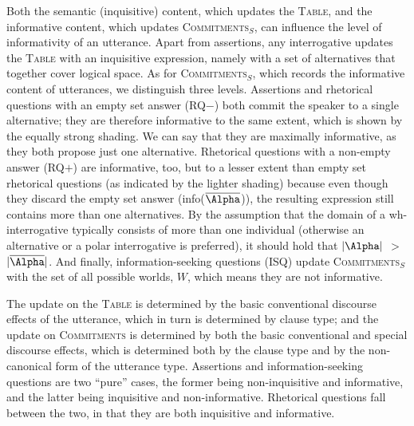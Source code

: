 \documentclass[output=paper,colorlinks,citecolor=brown            ,chinesefont]{langscibook}
\begin{document}
Both the semantic (inquisitive) content, which updates the \textsc{Table}, and the informative content, which updates \textsc{Commitments}$_S$, can influence the level of informativity of an utterance. Apart from assertions, any interrogative updates the \textsc{Table} with an inquisitive expression, namely with a set of alternatives that together cover logical space. As for \textsc{Commitments}$_S$, which records the informative content of utterances, we distinguish three levels. Assertions and rhetorical questions with an empty set answer (RQ$-$) both commit the speaker to a single alternative; they are therefore informative to the same extent, which is shown by the equally strong shading. We can say that they are maximally informative, as they both propose just one alternative. Rhetorical questions with a non-empty answer (RQ$+$) are informative, too, but to a lesser extent than empty set rhetorical questions (as indicated by the lighter shading) because even though they discard the empty set answer (info($\overline{\Alpha}$)), the resulting expression still contains more than one alternatives. By the assumption that the domain of a wh-interrogative typically consists of more than one individual (otherwise an alternative or a polar interrogative is preferred), it should hold that $|\Alpha|$ $>$ $|\overline{\Alpha}|$. And finally, information-seeking questions (ISQ) update \textsc{Commitments}$_S$ with the set of all possible worlds, $W$, which means they are not informative.

The update on the \textsc{Table} is determined by the basic conventional discourse effects of the utterance, which in turn is determined by clause type; and the update on \textsc{Commitments} is determined by both the basic conventional and special discourse effects, which is determined both by the clause type and by the non-canonical form of the utterance type. Assertions and information-seeking questions are two ``pure'' cases, the former being non-inquisitive and informative, and the latter being inquisitive and non-informative. Rhetorical questions fall between the two, in that they are both inquisitive and informative.
\end{document}

